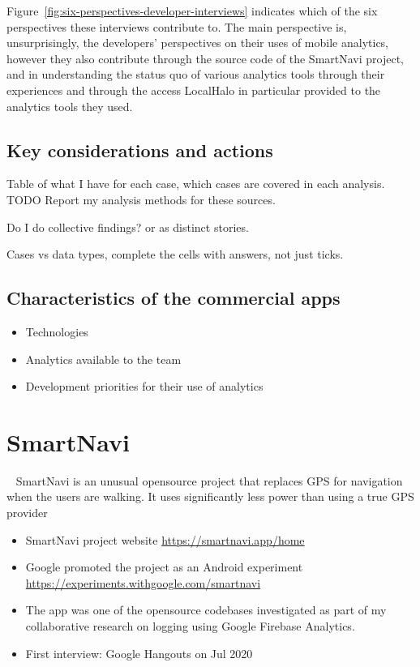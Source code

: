 Figure~\ref{fig:six-perspectives-developer-interviews} indicates which of the six perspectives these interviews contribute to. The main perspective is, unsurprisingly, the developers' perspectives on their uses of mobile analytics, however they also contribute through the source code of the SmartNavi project, and in understanding the status quo of various analytics tools through their experiences and through the access LocalHalo in particular provided to the analytics tools they used.


\dotfill
\subsection{Key considerations and actions}
Table of what I have for each case, which cases are covered in each analysis.
TODO Report my analysis methods for these sources.

Do I do collective findings? or as distinct stories.

Cases vs data types, complete the cells with answers, not just ticks.


\subsection{Characteristics of the commercial apps}

\begin{itemize}
    \item Technologies
    \item Analytics available to the team
    \item Development priorities for their use of analytics
\end{itemize}

\clearpage


\clearpage




\clearpage



\clearpage
\section{SmartNavi}~\label{study-smartnavi}
SmartNavi is an unusual opensource project that replaces GPS for navigation when the users are walking. It uses significantly less power than using a true GPS provider 

\begin{itemize}
    \item SmartNavi project website \url{https://smartnavi.app/home}
    \item Google promoted the project as an Android experiment \url{https://experiments.withgoogle.com/smartnavi}
    \item The app was one of the opensource codebases investigated as part of my collaborative research on logging using Google Firebase Analytics.
    \item First interview: Google Hangouts on  Jul 2020
\end{itemize}

